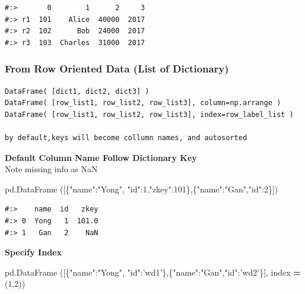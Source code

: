\documentclass[
]{book}
\newenvironment{Shaded}{\begin{snugshade}}{\end{snugshade}}
\newcommand{\DecValTok}[1]{\textcolor[rgb]{0.06,0.06,0.06}{#1}}
\newcommand{\NormalTok}[1]{#1}
\newcommand{\OperatorTok}[1]{\textcolor[rgb]{0.43,0.43,0.43}{\textbf{#1}}}
\newcommand{\StringTok}[1]{\textcolor[rgb]{0.5,0.5,0.5}{#1}}
\begin{document}
\begin{verbatim}
#:>       0        1      2     3
#:> r1  101    Alice  40000  2017
#:> r2  102      Bob  24000  2017
#:> r3  103  Charles  31000  2017
\end{verbatim}

\hypertarget{from-row-oriented-data-list-of-dictionary}{%
\subsubsection{From Row Oriented Data (List of Dictionary)}\label{from-row-oriented-data-list-of-dictionary}}

\begin{verbatim}
DataFrame( [dict1, dict2, dict3] )
DataFrame( [row_list1, row_list2, row_list3], column=np.arrange )
DataFrame( [row_list1, row_list2, row_list3], index=row_label_list )

by default,keys will become collumn names, and autosorted
\end{verbatim}

\textbf{Default Column Name Follow Dictionary Key}\\
Note missing info as NaN

\begin{Shaded}
\begin{Highlighting}[]
\NormalTok{pd.DataFrame ([\{}\StringTok{"name"}\NormalTok{:}\StringTok{"Yong"}\NormalTok{, }\StringTok{"id"}\NormalTok{:}\DecValTok{1}\NormalTok{,}\StringTok{"zkey"}\NormalTok{:}\DecValTok{101}\NormalTok{\},\{}\StringTok{"name"}\NormalTok{:}\StringTok{"Gan"}\NormalTok{,}\StringTok{"id"}\NormalTok{:}\DecValTok{2}\NormalTok{\}])}
\end{Highlighting}
\end{Shaded}

\begin{verbatim}
#:>    name  id   zkey
#:> 0  Yong   1  101.0
#:> 1   Gan   2    NaN
\end{verbatim}

\textbf{Specify Index}

\begin{Shaded}
\begin{Highlighting}[]
\NormalTok{pd.DataFrame ([\{}\StringTok{"name"}\NormalTok{:}\StringTok{"Yong"}\NormalTok{, }\StringTok{"id"}\NormalTok{:}\StringTok{'wd1'}\NormalTok{\},\{}\StringTok{"name"}\NormalTok{:}\StringTok{"Gan"}\NormalTok{,}\StringTok{"id"}\NormalTok{:}\StringTok{'wd2'}\NormalTok{\}], }
\NormalTok{             index }\OperatorTok{=}\NormalTok{ (}\DecValTok{1}\NormalTok{,}\DecValTok{2}\NormalTok{))}
\end{Highlighting}
\end{Shaded}
\end{document}
